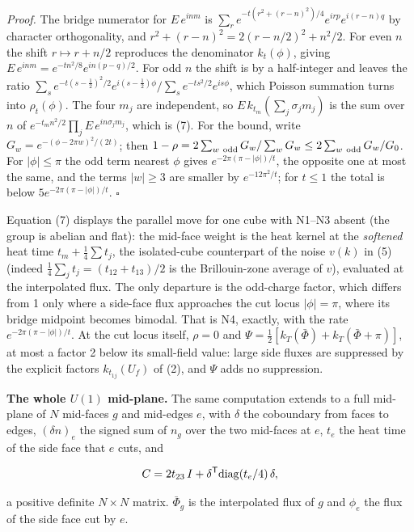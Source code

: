\documentclass[11pt,a4paper]{article}
\begin{document}
\emph{Proof.} The bridge numerator for \(E\,e^{inm}\) is
\(\sum_{r}e^{-t(r^2+(r-n)^2)/4}e^{irp}e^{i(r-n)q}\) by character
orthogonality, and \(r^2+(r-n)^2=2(r-n/2)^2+n^2/2\). For even \(n\) the
shift \(r\mapsto r+n/2\) reproduces the denominator \(k_t(\phi)\),
giving \(E\,e^{inm}=e^{-tn^2/8}e^{in(p-q)/2}\). For odd \(n\) the shift
is by a half-integer and leaves the ratio
\(\sum_se^{-t(s-\frac12)^2/2}e^{i(s-\frac12)\phi}/\sum_se^{-ts^2/2}e^{is\phi}\),
which Poisson summation turns into \(\rho_t(\phi)\). The four \(m_j\)
are independent, so \(E\,k_{t_m}(\sum_j\sigma_jm_j)\) is the sum over
\(n\) of \(e^{-t_mn^2/2}\prod_jE\,e^{in\sigma_jm_j}\), which is (7). For
the bound, write \(G_w=e^{-(\phi-2\pi w)^2/(2t)}\); then
\(1-\rho=2\sum_{w\ \rm odd}G_w/\sum_wG_w\le2\sum_{w\ \rm odd}G_w/G_0\).
For \(|\phi|\le\pi\) the odd term nearest \(\phi\) gives
\(e^{-2\pi(\pi-|\phi|)/t}\), the opposite one at most the same, and the
terms \(|w|\ge3\) are smaller by \(e^{-12\pi^2/t}\); for \(t\le1\) the
total is below \(5e^{-2\pi(\pi-|\phi|)/t}\). \(\square\)

Equation (7) displays the parallel move for one cube with N1--N3 absent
(the group is abelian and flat): the mid-face weight is the heat kernel
at the \emph{softened} heat time \(t_m+\frac14\sum t_j\), the
isolated-cube counterpart of the noise \(v(k)\) in (5) (indeed
\(\frac14\sum_jt_j=(t_{12}+t_{13})/2\) is the Brillouin-zone average of
\(v\)), evaluated at the interpolated flux. The only departure is the
odd-charge factor, which differs from 1 only where a side-face flux
approaches the cut locus \(|\phi|=\pi\), where its bridge midpoint
becomes bimodal. That is N4, exactly, with the rate
\(e^{-2\pi(\pi-|\phi|)/t}\). At the cut locus itself, \(\rho=0\) and
\(\Psi=\frac12[k_T(\bar\Phi)+k_T(\bar\Phi+\pi)]\), at most a factor 2
below its small-field value: large side fluxes are suppressed by the
explicit factors \(k_{t_{1j}}(U_f)\) of (2), and \(\Psi\) adds no
suppression.

\textbf{The whole \(U(1)\) mid-plane.} The same computation extends to a
full mid-plane of \(N\) mid-faces \(g\) and mid-edges \(e\), with
\(\delta\) the coboundary from faces to edges, \((\delta n)_e\) the
signed sum of \(n_g\) over the two mid-faces at \(e\), \(t_e\) the heat
time of the side face that \(e\) cuts, and

\[C=2t_{23}\,I+\delta^{\sf T}{\rm diag}(t_e/4)\,\delta ,\]

a positive definite \(N\times N\) matrix. \(\bar\Phi_g\) is the
interpolated flux of \(g\) and \(\phi_e\) the flux of the side face cut
by \(e\).
\end{document}
